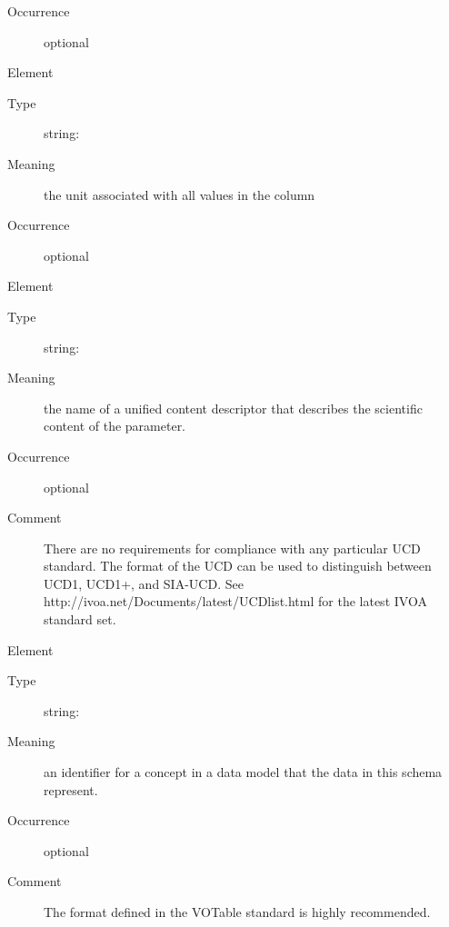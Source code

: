 \documentclass[11pt,a4paper]{ivoa}
\begin{document}
\begin{generated}
\begin{bigdescription}
\begin{description}
\item[Occurrence] optional

\end{description}
\item[Element \xmlel{unit}]
\begin{description}
\item[Type] string: 
\item[Meaning] 
                  the unit associated with all values in the column
               
\item[Occurrence] optional

\end{description}
\item[Element \xmlel{ucd}]
\begin{description}
\item[Type] string: 
\item[Meaning] 
                  the name of a unified content descriptor that
                  describes the scientific content of the parameter.  
               
\item[Occurrence] optional
\item[Comment] 
                  There are no requirements for compliance with any 
                  particular UCD standard.  The format of the UCD can
                  be used to distinguish between UCD1, UCD1+, and
                  SIA-UCD.  See 
                  http://ivoa.net/Documents/latest/UCDlist.html
                  for the latest IVOA standard set.  
               

\end{description}
\item[Element \xmlel{utype}]
\begin{description}
\item[Type] string: 
\item[Meaning] 
                  an identifier for a concept in a data model that
                  the data in this schema represent.  
               
\item[Occurrence] optional
\item[Comment] 
                  The format defined in the VOTable standard is highly
                  recommended. 
               

\end{description}


\end{bigdescription}\endgroup

\endgroup
\end{generated}
\end{document}
